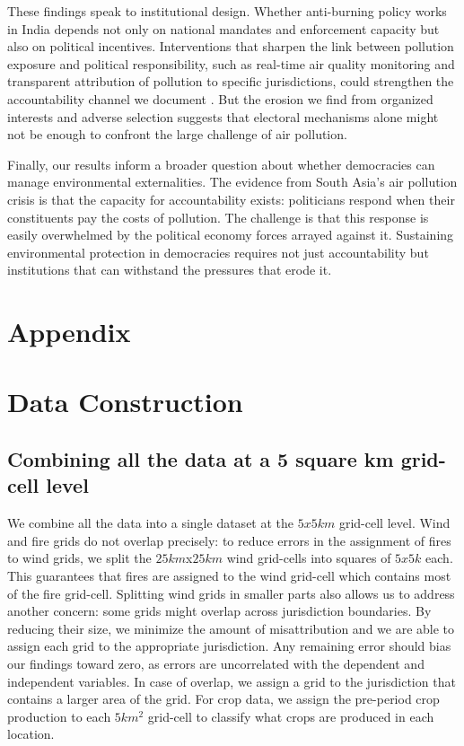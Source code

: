 \documentclass[12pt]{article}
\providecommand{\printbibliography}{}
\begin{document}
These findings speak to institutional design. Whether anti-burning policy works in India depends not only on national mandates and enforcement capacity but also on political incentives. 
Interventions that sharpen the link between pollution exposure and political responsibility, such as real-time air quality monitoring and transparent attribution of pollution to specific jurisdictions, could strengthen the accountability channel we document \citep{singh_thachil_2023_airpollution}. But the erosion we find from organized interests and adverse selection suggests that electoral mechanisms alone might not be enough to confront the large challenge of air pollution.

Finally, our results inform a broader question about whether democracies can manage environmental externalities. The evidence from South Asia's air pollution crisis is that the capacity for accountability exists: politicians respond when their constituents pay the costs of pollution. The challenge is that this response is easily overwhelmed by the political economy forces arrayed against it. Sustaining environmental protection in democracies requires not just accountability but institutions that can withstand the pressures that erode it.


\clearpage
\FloatBarrier
\printbibliography



\clearpage
\appendix

\setcounter{page}{1}
\setcounter{figure}{0}
\setcounter{table}{0}
\onehalfspacing



\section*{Appendix}
\section{Data Construction}
\subsection{Combining all the data at a 5 square km grid-cell level}\label{ssec:data_construction}
We combine all the data into a single dataset at the $5x5km$ grid-cell level. Wind and fire grids do not overlap precisely: to reduce errors in the assignment of fires to wind grids, we split the $25km$x$25km$ wind grid-cells into squares of $5x5k$ each. This guarantees that fires are assigned to the wind grid-cell which contains most of the fire grid-cell. Splitting wind grids in smaller parts also allows us to address another concern: some grids might overlap across jurisdiction boundaries. By reducing their size, we minimize the amount of misattribution and we are able to assign each grid to the appropriate jurisdiction. Any remaining error should bias our findings toward zero, as errors are uncorrelated with the dependent and independent variables. In case of overlap, we assign a grid to the jurisdiction that contains a larger area of the grid. For crop data, we assign the pre-period crop production to each $5km^2$ grid-cell to classify what crops are produced in each location. 
\end{document}
